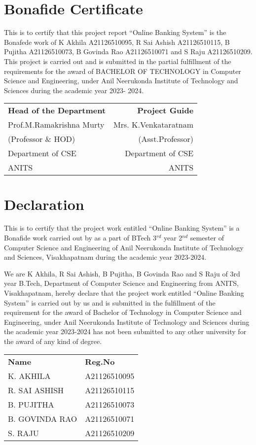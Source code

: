 \documentclass{report}
\begin{document}
\chapter*{Bonafide Certificate}
This is to certify that this project report ``Online Banking System'' is the Bonafede
work of K Akhila A21126510095, R Sai Ashish A21126510115, B Pujitha
A21126510073, B Govinda Rao A21126510071 and S Raju A21126510209. This
project is carried out and is submitted in the partial fulfillment of the requirements for
the award of BACHELOR OF TECHNOLOGY in Computer Science and
Engineering, under Anil Neerukonda Institute of Technology and Sciences during the
academic year 2023- 2024.

\vspace{1cm}
\noindent\begin{tabular}{lr}
\textbf{Head of the Department} & \textbf{Project Guide} \\
Prof.M.Ramakrishna Murty & Mrs. K.Venkataratnam \\
(Professor \& HOD) & (Asst.Professor) \\
Department of CSE & Department of CSE \\
ANITS & ANITS
\end{tabular}

\chapter*{Declaration}
This is to certify that the project work entitled ``Online Banking System'' is a
Bonafide work carried out by as a part of BTech 3$^{rd}$ year 2$^{nd}$ semester of Computer
Science and Engineering of Anil Neerukonda Institute of Technology and Sciences,
Visakhapatnam during the academic year 2023-2024.

We are K Akhila, R Sai Ashish, B Pujitha, B Govinda Rao and S Raju of 3rd year
B.Tech, Department of Computer Science and Engineering from ANITS,
Visakhapatnam, hereby declare that the project work entitled ``Online Banking
System'' is carried out by us and is submitted in the fulfillment of the requirement for
the award of Bachelor of Technology in Computer Science and Engineering, under
Anil Neerukonda Institute of Technology and Sciences during the academic year
2023-2024 has not been submitted to any other university for the award of any kind of
degree.

\vspace{1cm}
\noindent\begin{tabular}{ll}
\textbf{Name} & \textbf{Reg.No} \\
K. AKHILA & A21126510095 \\
R. SAI ASHISH & A21126510115 \\
B. PUJITHA & A21126510073 \\
B. GOVINDA RAO & A21126510071 \\
S. RAJU & A21126510209
\end{tabular}
\end{document}
